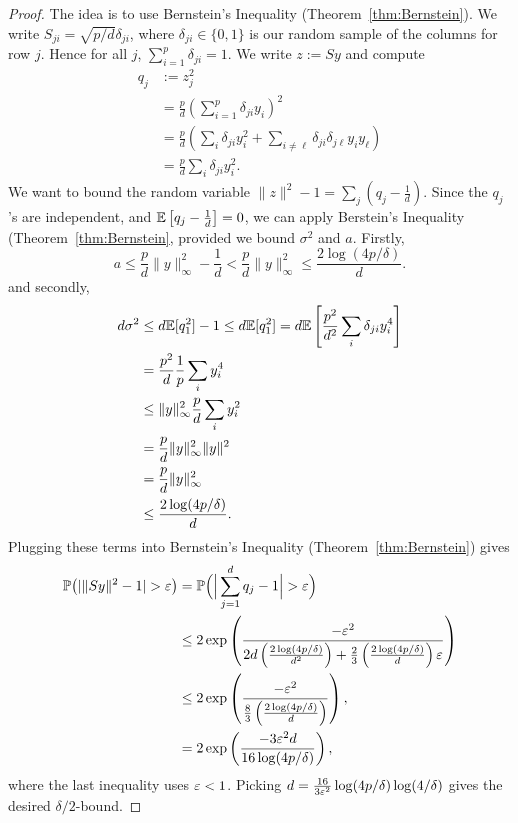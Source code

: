 \begin{proof}


The idea is to use Bernstein's Inequality (Theorem~\ref{thm:Bernstein}).
We write $S_{ji} = \sqrt{p/d} \delta_{ji}$, where $\delta_{ji} \in \{0,1\}$ is our random sample of the columns for row $j$. Hence for all $j$,
$\sum_{i=1}^p \delta_{ji} = 1$. We write $z:= Sy$ and compute
\begin{align*}
q_j & := z_j^2 \\
      & = \frac{p}{d} \left( \sum_{i=1}^p \delta_{ji} y_i \right)^2 \\
      & = \frac{p}{d} \left( \sum_{i} \delta_{ji} y_i^2 +   \sum_{i \neq \ell} \delta_{ji} \delta_{j\ell} y_i y_{\ell} \right) \\
       & = \frac{p}{d} \sum_{i} \delta_{ji}y_i^2.
\end{align*}
We want to bound the random variable $\|z\|^2 -1= \sum_j \left(q_j-\frac1d\right)$.  Since the $q_j$'s are independent, and $\mathbb{E}\left[q_j-\frac1d\right]=0$, we can apply Berstein's Inequality (Theorem~\ref{thm:Bernstein}, provided we bound $\sigma^2$ and $a$. Firstly,
$$a \le \frac{p}{d}\|y\|_\infty^2 -\frac1d < \frac{p}{d}\|y\|_\infty^2 \leq  \frac{2\log (4p/\delta)}{d}.$$%
and secondly,
\begin{align*}
d\sigma^2 &  \le d \mathbb{E}[ q_1^2]  - 1 \le d \mathbb{E}[ q_1^2]  = d \mathbb{E} \left[ \frac{p^2}{d^2} \sum_i \delta_{ji} y_i^4 \right] \\
& = \frac{p^2}{d} \frac1p\sum_i y_i^4 \\
& \leq \|y\|_\infty^2 \frac{p}{d} \sum_i y_i^2 \\
& = \frac{p}{d} \|y\|_\infty^2  \|y\|^2 \\
& = \frac{p}{d} \|y\|_\infty^2 \\
& \leq  \frac{2\log (4p/\delta)}{d}.
\end{align*}
Plugging these terms into Bernstein's Inequality (Theorem~\ref{thm:Bernstein}) gives
\begin{align*} \mathbb{P} \big( | \|Sy\|^2 - 1 | > \varepsilon \big)  & = \mathbb{P} \Big( \Big| \sum_{j=1}^d q_j - 1 \Big| > \varepsilon \Big) \\
& \leq 2 \exp\left(  \frac{-\varepsilon^2}{2d\left(\frac{2\log (4p/\delta)}{d^2}\right) + \frac23\left(\frac{2\log (4p/\delta)}{d}\right)\varepsilon  } \right)\\
& \leq 2 \exp\left(  \frac{-\varepsilon^2}{\frac83\left(\frac{2\log (4p/\delta)}{d}\right)  } \right),\\
& = 2 \exp\left(  \frac{-3\varepsilon^2d}{16\log (4p/\delta)  } \right),
\end{align*}
where the last inequality uses $\varepsilon<1$.
Picking $d = \frac{16}{3\varepsilon^2} \log(4p/\delta) \log(4/\delta)$ gives the desired $\delta/2$-bound.

\end{proof}


